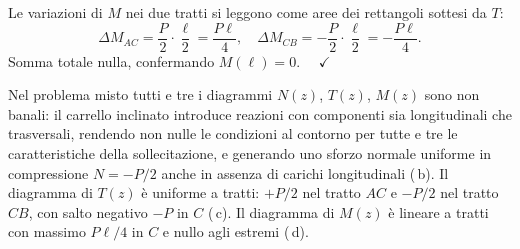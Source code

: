 \begin{esempio}
\begin{svolgimento}
		Le variazioni di $M$ nei due tratti si leggono
		come aree dei rettangoli sottesi da $T$:
		\[
		\Delta M_{AC} = \frac{P}{2}\cdot\frac{\ell}{2}
		= \frac{P\ell}{4}, \quad
		\Delta M_{CB} = -\frac{P}{2}\cdot\frac{\ell}{2}
		= -\frac{P\ell}{4}.
		\]
		Somma totale nulla, confermando
		$M(\ell) = 0$. $\quad\checkmark$
		
		\noindent
		Nel problema misto tutti e tre i diagrammi
		$N(z)$, $T(z)$, $M(z)$ sono non banali: il
		carrello inclinato introduce reazioni con
		componenti sia longitudinali che trasversali,
		rendendo non nulle le condizioni al contorno
		per tutte e tre le caratteristiche della
		sollecitazione, e generando uno sforzo normale
		uniforme in compressione $N = -P/2$ anche
		in assenza di carichi longitudinali
		(\,b).
		Il diagramma di $T(z)$ è uniforme a tratti:
		$+P/2$ nel tratto $AC$ e $-P/2$ nel tratto
		$CB$, con salto negativo $-P$ in $C$
		(\,c).
		Il diagramma di $M(z)$ è lineare a tratti
		con massimo $P\ell/4$ in $C$ e nullo agli
		estremi (\,d).
	\end{svolgimento}
\end{esempio}


